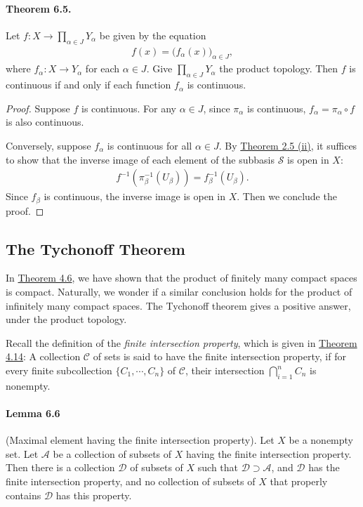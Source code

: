 \documentclass{article}
\numberwithin{equation}{section}
\theoremstyle{plain}
\theoremstyle{definition}
\begin{document}
\paragraph{Theorem 6.5.\label{thm:6.5}} Let $f:X\to\prod_{\alpha\in J}Y_\alpha$ be given by the equation
\begin{align*}
	f(x) = \bigl(f_\alpha(x)\bigr)_{\alpha\in J},
\end{align*}
where $f_\alpha:X\to Y_\alpha$ for each $\alpha\in J$. Give $\prod_{\alpha\in J}Y_\alpha$ the product topology. Then $f$ is continuous if and only if each function $f_\alpha$ is continuous.
\begin{proof}
Suppose $f$ is continuous. For any $\alpha\in J$, since $\pi_\alpha$ is continuous, $f_\alpha = \pi_\alpha\circ f$ is also continuous.

Conversely, suppose $f_\alpha$ is continuous for all $\alpha\in J$. By \hyperref[thm:2.5]{Theorem 2.5 (ii)}, it suffices to show that the inverse image of each element of the subbasis $\mathscr{S}$ is open in $X$:
\begin{align*}
	f^{-1}(\pi_\beta^{-1}(U_\beta)) = f_\beta^{-1}(U_\beta).
\end{align*}
Since $f_\beta$ is continuous, the inverse image is open in $X$. Then we conclude the proof.
\end{proof}

\subsection{The Tychonoff Theorem}
In \hyperref[thm:4.6]{Theorem 4.6}, we have shown that the product of finitely many compact spaces is compact. Naturally, we wonder if a similar conclusion holds for the product of infinitely many compact spaces. The Tychonoff theorem gives a positive answer, under the product topology.

Recall the definition of the \textit{finite intersection property}, which is given in \hyperref[thm:4.14]{Theorem 4.14}: A collection $\mathscr{C}$ of sets is said to have the finite intersection property, if for every finite subcollection $\{C_1,\cdots,C_n\}$ of $\mathscr{C}$, their intersection $\bigcap_{i=1}^n C_n$ is nonempty.

\paragraph{Lemma 6.6\label{lemma:6.6}} (Maximal element having the finite intersection property). Let $X$ be a nonempty set. Let $\mathscr{A}$ be a collection of subsets of $X$ having the finite intersection property. Then there is a collection $\mathscr{D}$ of subsets of $X$ such that $\mathscr{D}\supset\mathscr{A}$, and $\mathscr{D}$ has the finite intersection property, and no collection of subsets of $X$ that properly contains $\mathscr{D}$ has this property.
\end{document}

